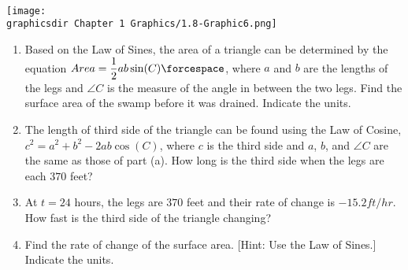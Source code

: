  \\[11pt]
\begin{minipage}{0.49\textwidth}
    \vspace{-11pt} %
    \texttt{[image: \\graphicsdir Chapter 1 Graphics/1.8-Graphic6.png]}
    \vspace{22pt}
    \begin{center}
    \end{center}
\end{minipage} \hfill \begin{minipage}{0.5\textwidth} \vspace{0pt}%
    \begin{enumerate}[label=\hspace{11pt}(\alph*), align=left, leftmargin=*, labelsep=0.25em, itemsep=1em]
        \item Based on the Law of Sines, the area of a triangle can be determined by the equation $Area = \dfrac{1}{2}ab\sin (C) \forcespace$, where $a$ and $b$ are the lengths of the legs and $\angle C$ is the measure of the angle in between the two legs. Find the surface area of the swamp before it was drained. Indicate the units.
        \item The length of third side of the triangle can be found using the Law of Cosine, $c^2 = a^2 + b^2 - 2ab\cos(C)$, where $c$ is the third side and $a$, $b$, and $\angle C$ are the same as those of part (a). How long is the third side when the legs are each $370$ feet?
        \item At $t = 24$ hours, the legs are $370$ feet and their rate of change is $-15.2 \si{ft \per hr}$. How fast is the third side of the triangle changing?
        \item Find the rate of change of the surface area. [Hint: Use the Law of Sines.] Indicate the units.
    \end{enumerate} \vspace{11pt}
\end{minipage}

